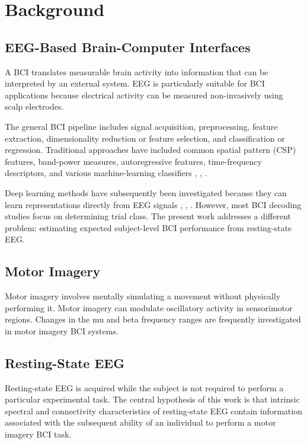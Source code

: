 \documentclass[conference]{IEEEtran}
\begin{document}
\section{Background}
\subsection{EEG-Based Brain-Computer Interfaces}
A BCI translates measurable brain activity into information that can be interpreted by an external system. EEG is particularly suitable for BCI applications because electrical activity can be measured non-invasively using scalp electrodes.

The general BCI pipeline includes signal acquisition, preprocessing, feature extraction, dimensionality reduction or feature selection, and classification or regression. Traditional approaches have included common spatial pattern (CSP) features, band-power measures, autoregressive features, time-frequency descriptors, and various machine-learning classifiers \cite{blankertz2008}, \cite{ramoser2000}, \cite{ang2008}.

Deep learning methods have subsequently been investigated because they can learn representations directly from EEG signals \cite{schirrmeister2017}, \cite{lawhern2018}, \cite{roy2019}. However, most BCI decoding studies focus on determining trial class. The present work addresses a different problem: estimating expected subject-level BCI performance from resting-state EEG.

\subsection{Motor Imagery}
Motor imagery involves mentally simulating a movement without physically performing it. Motor imagery can modulate oscillatory activity in sensorimotor regions. Changes in the mu and beta frequency ranges are frequently investigated in motor imagery BCI systems.

\subsection{Resting-State EEG}
Resting-state EEG is acquired while the subject is not required to perform a particular experimental task. The central hypothesis of this work is that intrinsic spectral and connectivity characteristics of resting-state EEG contain information associated with the subsequent ability of an individual to perform a motor imagery BCI task.
\end{document}
